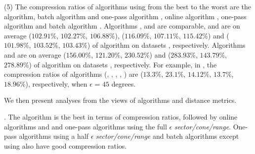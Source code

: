 \sstab(5) The compression ratios of algorithms using \dad from the best
to the worst are the \opt algorithm, batch algorithm \tpa and
one-pass algorithm \interval, online algorithm \opwa, one-pass algorithm \intersec and batch algorithm \dpa.
%
{Algorithms \tpa, \opwa and \interval are comparable, and are on average
($102.91\%$, $102.27\%$, $106.88\%$), ($116.09\%$, $107.11\%$, $115.42\%$) and ($101.98\%$, $103.52\%$, $103.43\%$)
 of algorithm \opt on datasets \dSets, respectively.}
%
{Algorithms \intersec and \dpa are on average ($156.00\%$, $121.20\%$, $230.52\%$) and ($283.93\%$, $143.79\%$, $278.89\%$)
 of algorithm \opt on datasets \dSets, respectively.}
%
For example, in \mopsi, the compression ratios of algorithms (\tpa, \dpa, \opwa, \interval, \intersec)
are ($13.3\%$, $23.1\%$, $14.12\%$, $13.7\%$, $18.96\%$), respectively, when $\epsilon$ = $45$ degrees.
%






We then present analyses from the views of \lsa algorithms and distance metrics.


. The \opt algorithm is the best in terms of compression ratios, followed by online algorithms \opwa and \bqsa and one-pass algorithms using the full $\epsilon$ \emph{sector/cone/range}. One-pass algorithms using a half $\epsilon$ \emph{sector/cone/range} and batch algorithms except \dpa using \dad also have good compression ratios.


